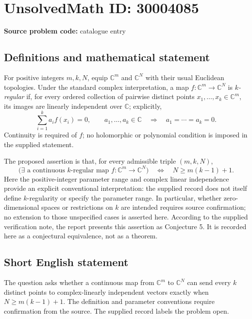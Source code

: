 \documentclass[11pt]{article}
\newcommand{\C}{\mathbb{C}}
\begin{document}
\section*{UnsolvedMath ID: 30004085}
\textbf{Source problem code:} catalogue entry
\subsection{Definitions and mathematical statement}
For positive integers \(m,k,N\), equip \(\C^m\) and \(\C^N\) with their usual Euclidean topologies. Under the standard complex interpretation, a map \(f:\C^m\to\C^N\) is \emph{\(k\)-regular} if, for every ordered collection of pairwise distinct points \(x_1,\ldots,x_k\in\C^m\), its images are linearly independent over \(\C\); explicitly,
\[
\sum_{i=1}^{k}a_i f(x_i)=0,\qquad a_1,\ldots,a_k\in\C
\quad\Longrightarrow\quad
 a_1=\cdots=a_k=0.
\]
Continuity is required of \(f\); no holomorphic or polynomial condition is imposed in the supplied statement.

The proposed assertion is that, for every admissible triple \((m,k,N)\),
\[
\bigl(\exists\text{ a continuous \(k\)-regular map }f:\C^m\to\C^N\bigr)
\quad\Longleftrightarrow\quad
N\geq m(k-1)+1.
\]
Here the positive-integer parameter range and complex linear independence provide an explicit conventional interpretation: the supplied record does not itself define \(k\)-regularity or specify the parameter range. In particular, whether zero-dimensional spaces or restrictions on \(k\) are intended requires source confirmation; no extension to those unspecified cases is asserted here. According to the supplied verification note, the report presents this assertion as Conjecture 5. It is recorded here as a conjectural equivalence, not as a theorem.
\subsection{Short English statement}
The question asks whether a continuous map from \(\C^m\) to \(\C^N\) can send every \(k\) distinct points to complex-linearly independent vectors exactly when \(N\geq m(k-1)+1\). The definition and parameter conventions require confirmation from the source. The supplied record labels the problem open.
\end{document}
